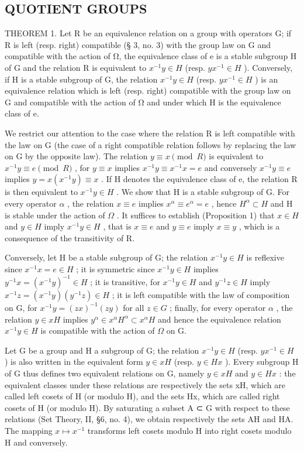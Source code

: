 \subsection{QUOTIENT GROUPS}

THEOREM 1. Let R be an equivalence relation on a group with operators G; if R is left (resp. right) compatible (§ 3, no. 3) with the group law on G and compatible with the action of Ω, the equivalence class of e is a stable subgroup H of G and the relation R is equivalent to \(x^{-1}y \in H\) (resp. \(yx^{-1} \in H\) ). Conversely, if H is a stable subgroup of G, the relation \(x^{-1}y \in H\) (resp. \(yx^{-1} \in H\) ) is an equivalence relation which is left (resp. right) compatible with the group law on G and compatible with the action of Ω and under which H is the equivalence class of e.

We restrict our attention to the case where the relation R is left compatible with the law on G (the case of a right compatible relation follows by replacing the law on G by the opposite law). The relation \(y \equiv x \pmod{R}\) is equivalent to \(x^{-1}y \equiv e \pmod{R}\) , for \(y \equiv x\) implies \(x^{-1}y \equiv x^{-1}x = e\) and conversely \(x^{-1}y \equiv e\) implies \(y = x(x^{-1}y) \equiv x\) . If H denotes the equivalence class of e, the relation R is then equivalent to \(x^{-1}y \in H\) . We show that H is a stable subgroup of G. For every operator \(\alpha\) , the relation \(x \equiv e\) implies \(x^{\alpha} \equiv e^{\alpha} = e\) , hence \(H^{\alpha} \subset H\) and H is stable under the action of \(\Omega\) . It suffices to establish (Proposition 1) that \(x \in H\) and \(y \in H\) imply \(x^{-1}y \in H\) , that is \(x \equiv e\) and \(y \equiv e\) imply \(x \equiv y\) , which is a consequence of the transitivity of R.

Conversely, let H be a stable subgroup of G; the relation \(x^{-1}y \in H\) is reflexive since \(x^{-1}x = e \in H\) ; it is symmetric since \(x^{-1}y \in H\) implies \(y^{-1}x = (x^{-1}y)^{-1} \in H\) ; it is transitive, for \(x^{-1}y \in H\) and \(y^{-1}z \in H\) imply \(x^{-1}z = (x^{-1}y)(y^{-1}z) \in H\) ; it is left compatible with the law of composition on G, for \(x^{-1}y = (zx)^{-1}(zy)\) for all \(z \in G\) ; finally, for every operator \(\alpha\) , the relation \(y \in xH\) implies \(y^{\alpha} \in x^{\alpha}H^{\alpha} \subset x^{\alpha}H\) and hence the equivalence relation \(x^{-1}y \in H\) is compatible with the action of \(\Omega\) on G.

Let G be a group and H a subgroup of G; the relation \(x^{-1}y \in H\) (resp. \(yx^{-1} \in H\) ) is also written in the equivalent form \(y \in xH\) (resp. \(y \in Hx\) ). Every subgroup H of G thus defines two equivalent relations on G, namely \(y \in xH\) and \(y \in Hx\) : the equivalent classes under these relations are respectively the sets xH, which are called left cosets of H (or modulo H), and the sets Hx, which are called right cosets of H (or modulo H). By saturating a subset A ⊂ G with respect to these relations (Set Theory, II, §6, no. 4), we obtain respectively the sets AH and HA. The mapping \(x \mapsto x^{-1}\) transforms left cosets modulo H into right cosets modulo H and conversely.


